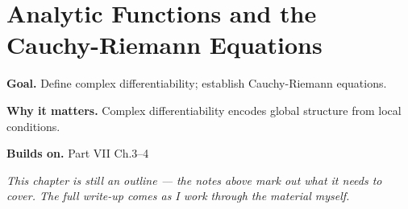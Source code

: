 \chapter{Analytic Functions and the Cauchy-Riemann Equations}
\label{ch:08-complex-analysis-and-harmonic-analysis-01}

\begin{chapterintro}
\textbf{Goal.} Define complex differentiability; establish Cauchy-Riemann equations.

\textbf{Why it matters.} Complex differentiability encodes global structure from local conditions.

\textbf{Builds on.} Part VII Ch.3–4
\end{chapterintro}

\textit{This chapter is still an outline --- the notes above mark out what it needs to cover. The full write-up comes as I work through the material myself.}

